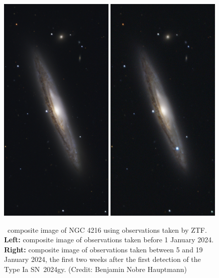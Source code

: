 \documentclass[a4paper,oneside,12pt, class=Latex/Classes/PhDthesisPSnPDF, crop=false]{standalone}
\begin{document}
\begin{figure}
    \centering
    \includegraphics[width=0.49\textwidth]{../Images/chapter_1/SN2024gy_pre-SN.png}
    \includegraphics[width=0.49\textwidth]{../Images/chapter_1/SN2024gy_active.png}
    \caption{\ztfg\ztfr\ztfi\ composite image of NGC 4216 using observations taken by ZTF.\\
    \textbf{Left:} composite image of observations taken before 1 January 2024.\\
    \textbf{Right:} composite image of observations taken between 5 and 19 January 2024, the first two weeks after the first detection of the Type Ia SN~2024gy. (Credit: Benjamin Nobre Hauptmann)} %
    \label{2024gy_ZTF}
\end{figure}
\end{document}
